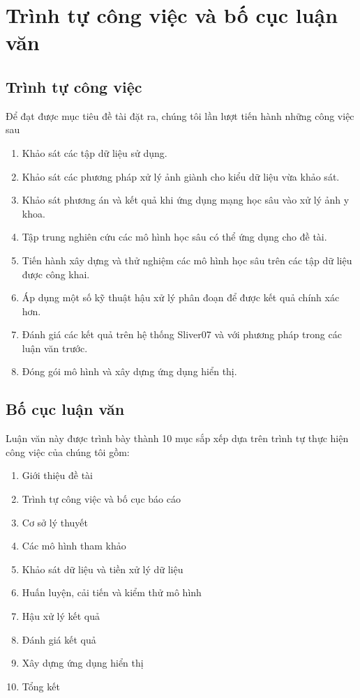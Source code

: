 \chapter{Trình tự công việc và bố cục luận văn}
\section{Trình tự công việc}
Để đạt được mục tiêu đề tài đặt ra, chúng tôi lần lượt tiến hành những công việc sau
\begin{enumerate}
    \item Khảo sát các tập dữ liệu sử dụng.
    \item Khảo sát các phương pháp xử lý ảnh giành cho kiểu dữ liệu vừa khảo sát.
    \item Khảo sát phương án và kết quả khi ứng dụng mạng học sâu vào xử lý ảnh y khoa.
    \item Tập trung nghiên cứu các mô hình học sâu có thể ứng dụng cho đề tài.
    \item Tiến hành xây dựng và thử nghiệm các mô hình học sâu trên các tập dữ liệu được công khai.
    \item Áp dụng một số kỹ thuật hậu xử lý phân đoạn để được kết quả chính xác hơn.
    \item Đánh giá các kết quả trên hệ thống Sliver07 và với phương pháp trong các luận văn trước.
    \item Đóng gói mô hình và xây dựng ứng dụng hiển thị.
\end{enumerate}
\section{Bố cục luận văn}
Luận văn này được trình bày thành 10 mục sắp xếp dựa trên trình tự thực hiện công việc của chúng tôi gồm:
\begin{enumerate}
    \item Giới thiệu đề tài
    \item Trình tự công việc và bố cục báo cáo
    \item Cơ sở lý thuyết
    \item Các mô hình tham khảo
    \item Khảo sát dữ liệu và tiền xử lý dữ liệu
    \item Huấn luyện, cải tiến và kiểm thử mô hình
    \item Hậu xử lý kết quả
    \item Đánh giá kết quả
    \item Xây dựng ứng dụng hiển thị
    \item Tổng kết
\end{enumerate}